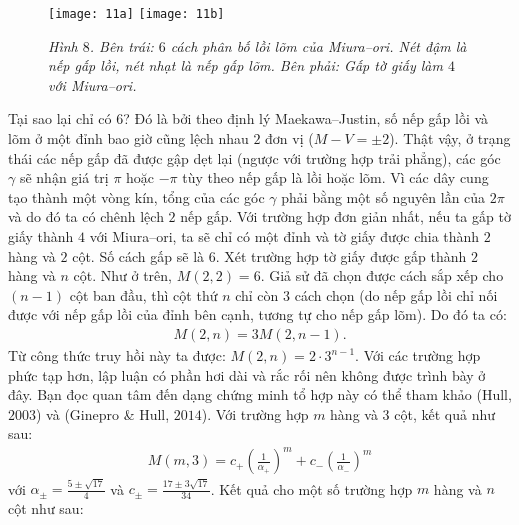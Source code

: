 \begin{multicols}{2}
		\begin{figure}[H]
		\vspace*{5pt}
		\centering
		\captionsetup{labelformat= empty, justification=centering}
		\texttt{[image: 11a]}
		\texttt{[image: 11b]}
		\caption{\small\textit{\color{duongvaotoanhoc}Hình $8$. Bên trái: $6$ cách phân bố lồi lõm của Miura--ori. Nét đậm là nếp gấp lồi, nét nhạt là nếp gấp lõm. Bên phải: Gấp tờ giấy làm $4$ với Miura--ori. }}
		\vspace*{-10pt}
	\end{figure}
	Tại sao lại chỉ có $6$? Đó là bởi theo định lý Maekawa--Justin, số nếp gấp lồi và lõm ở một đỉnh bao giờ cũng lệch nhau $2$ đơn vị ($M-V=±2$). Thật vậy, ở trạng thái các nếp gấp đã được gập dẹt lại (ngược với trường hợp trải phẳng), các góc $\gamma$ sẽ nhận giá trị $\pi$ hoặc $-\pi$ tùy theo nếp gấp là lồi hoặc lõm. Vì các dây cung tạo thành một vòng kín, tổng của các góc $\gamma$ phải bằng một số nguyên lần của $2\pi$ và do đó ta có chênh lệch $2$ nếp gấp.
	\vskip 0.05cm
	Với trường hợp đơn giản nhất, nếu ta gấp tờ giấy thành $4$ với Miura--ori, ta sẽ chỉ có một đỉnh và tờ giấy được chia thành $2$ hàng và $2$ cột. Số cách gấp sẽ là $6$.
	\vskip 0.05cm 
	Xét trường hợp tờ giấy được gấp thành $2$ hàng và $n$ cột. Như ở trên, $M(2,2)=6$. Giả sử đã chọn được cách sắp xếp cho $(n-1)$ cột ban đầu, thì cột thứ $n$ chỉ còn $3$ cách chọn (do nếp gấp lồi chỉ nối được với nếp gấp lồi của đỉnh bên cạnh, tương tự cho nếp gấp lõm). Do đó ta có: 
	\begin{align*}
		M(2,n)=3M(2,n-1).
	\end{align*}
	Từ công thức truy hồi này ta được: $M(2,n)=2\cdot3^{n-1}$.
	\vskip 0.05cm
	Với các trường hợp phức tạp hơn, lập luận có phần hơi dài và rắc rối nên không được trình bày ở đây. Bạn đọc quan tâm đến dạng chứng minh tổ hợp này có thể tham khảo (Hull, $2003$) và (Ginepro \& Hull, $2014$).
	\vskip 0.05cm
	Với trường hợp $m$ hàng và $3$ cột, kết quả như sau:
	\begin{align*}
		M(m,3) = c_+ \left(\frac{1}{\alpha_+}\right)^m + c_-\left(\frac{1}{\alpha_-}\right)^m
	\end{align*}
	với $\alpha_{\pm} = \frac{5 \pm \sqrt{17}}{4}$ và $c_{\pm} = \frac{17 \pm 3\sqrt{17}}{34}$.
	\vskip 0.05cm
 	Kết quả cho một số trường hợp $m$ hàng và $n$ cột như sau:
	\begin{table}[H]
		\setlength{\tabcolsep}{3pt}
		\renewcommand{\arraystretch}{1.2}
\end{table}
\end{multicols}
